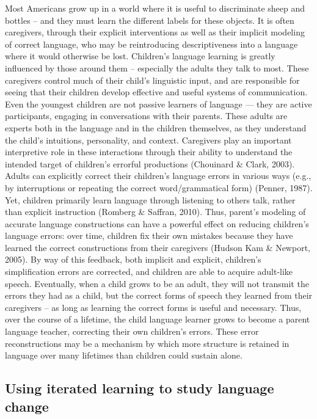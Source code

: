 \documentclass[10pt, letterpaper]{article}
\begin{document}
Most Americans grow up in a world where it is useful to discriminate
sheep and bottles -- and they must learn the different labels for these
objects. It is often caregivers, through their explicit interventions as
well as their implicit modeling of correct language, who may be
reintroducing descriptiveness into a language where it would otherwise
be lost. Children's language learning is greatly influenced by those
around them -- especially the adults they talk to most. These caregivers
control much of their child's linguistic input, and are responsible for
seeing that their children develop effective and useful systems of
communication. Even the youngest children are not passive learners of
language --- they are active participants, engaging in conversations
with their parents. These adults are experts both in the language and in
the children themselves, as they understand the child's intuitions,
personality, and context. Caregivers play an important interpretive role
in these interactions through their ability to understand the intended
target of children's errorful productions (Chouinard \& Clark, 2003).
Adults can explicitly correct their children's language errors in
various ways (e.g., by interruptions or repeating the correct
word/grammatical form) (Penner, 1987). Yet, children primarily learn
language through listening to others talk, rather than explicit
instruction (Romberg \& Saffran, 2010). Thus, parent's modeling of
accurate language constructions can have a powerful effect on reducing
children's language errors: over time, children fix their own mistakes
because they have learned the correct constructions from their
caregivers (Hudson Kam \& Newport, 2005). By way of this feedback, both
implicit and explicit, children's simplification errors are corrected,
and children are able to acquire adult-like speech. Eventually, when a
child grows to be an adult, they will not transmit the errors they had
as a child, but the correct forms of speech they learned from their
caregivers -- as long as learning the correct forms is useful and
necessary. Thus, over the course of a lifetime, the child language
learner grows to become a parent language teacher, correcting their own
children's errors. These error reconstructions may be a mechanism by
which more structure is retained in language over many lifetimes than
children could sustain alone.

\hypertarget{using-iterated-learning-to-study-language-change}{%
\subsection{Using iterated learning to study language
change}\label{using-iterated-learning-to-study-language-change}}
\end{document}
